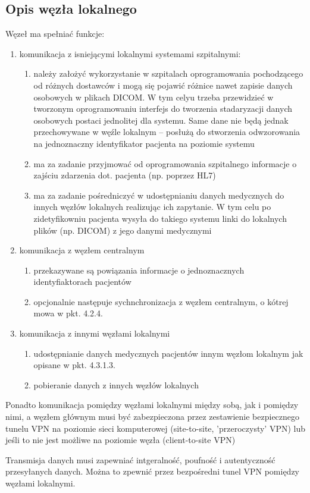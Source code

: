 \documentclass[a4paper]{article}
\begin{document}
\subsection{Opis węzła lokalnego}
Węzeł ma spełniać funkcje:
\begin{enumerate}
\item komunikacja z isniejącymi lokalnymi systemami szpitalnymi:
  \begin{enumerate}
  \item należy założyć wykorzystanie w szpitalach oprogramowania pochodzącego od różnych dostawców i mogą  się pojawić różnice nawet zapisie danych osobowych w plikach DICOM. W tym celyu trzeba przewidzieć w tworzonym oprogramowaniu interfejs do tworzenia stadaryzacji danych osobowych postaci jednolitej dla systemu. Same dane nie będą jednak przechowywane w węźle lokalnym – posłużą do stworzenia odwzorowania na jednoznaczny identyfikator pacjenta na poziomie systemu
  \item ma za zadanie przyjmować od oprogramowania szpitalnego informacje o zajściu zdarzenia dot. pacjenta (np. poprzez HL7)
  \item ma za zadanie pośredniczyć w udostępnianiu danych medycznych do innych węzłów lokalnych realizując ich zapytanie. W tym celu po zidetyfikowniu pacjenta wysyła do takiego systemu linki do lokalnych plików (np. DICOM) z jego danymi medycznymi
  \end{enumerate}

\item komunikacja z węzłem centralnym
  \begin{enumerate}
  \item przekazywane są powiązania informacje o jednoznacznych identyfiaktorach pacjentów
  \item opcjonalnie następuje sychnchronizacja z węzłem centralnym, o kótrej mowa w pkt. 4.2.4.
  \end{enumerate}

\item komunikacja z innymi węzłami lokalnymi
  \begin{enumerate}
  \item udostępnianie danych medycznych pacjentów innym węzłom lokalnym jak opisane w pkt.  4.3.1.3.
  \item pobieranie danych z innych węzłów lokalnych
  \end{enumerate}
\end{enumerate}

Ponadto komunikacja pomiędzy węzłami lokalnymi między sobą, jak i pomiędzy nimi, a węzłem głównym musi być zabezpieczona przez zestawienie bezpiecznego tunelu VPN na poziomie sieci komputerowej (site-to-site, 'przeroczysty' VPN) lub jeśli to nie jest możliwe na poziomie węzła (client-to-site VPN)

Transmisja danych musi zapewniać intgeralność, poufność i autentyczność przesyłanych danych. Można to zpewnić przez bezpośredni tunel VPN pomiędzy węzłami lokalnymi.
\end{document}
